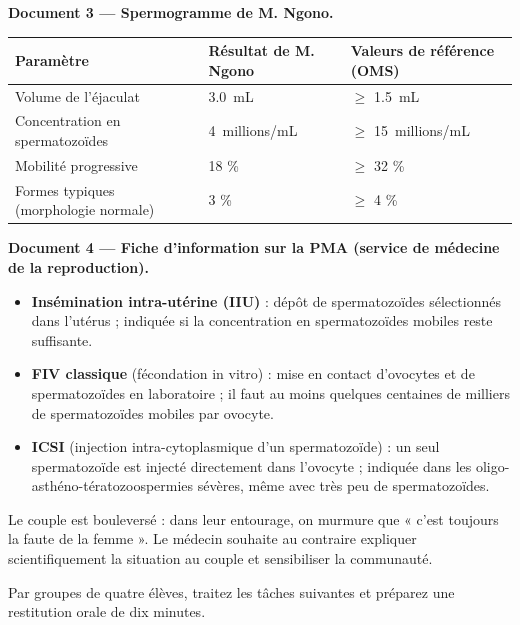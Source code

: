 \documentclass[11pt]{article}
\newcounter{popsec}
\newcounter{popsub}
\newcommand{\courssub}[1]{%
  \stepcounter{popsub}%
  \par\vspace{9pt}\noindent{\popxbold\fontsize{11.5}{13}\selectfont\color{popink}{\color{poporange}\thepopsec.\thepopsub}\hspace{6pt}#1}\par\nopagebreak\vspace{4pt}
}
\begin{document}
\textbf{Document 3 — Spermogramme de M. Ngono.}

\begin{center}
\begin{tabularx}{\linewidth}{|l|X|X|}
\hline
\rowcolor{popblueL} \textbf{Paramètre} & \textbf{Résultat de M. Ngono} & \textbf{Valeurs de référence (OMS)} \\
\hline
Volume de l'éjaculat & \SI{3,0}{mL} & $\geq$ \SI{1,5}{mL} \\
\hline
Concentration en spermatozoïdes & \SI{4}{millions/mL} & $\geq$ \SI{15}{millions/mL} \\
\hline
Mobilité progressive & 18 \% & $\geq$ 32 \% \\
\hline
Formes typiques (morphologie normale) & 3 \% & $\geq$ 4 \% \\
\hline
\end{tabularx}
\end{center}

\textbf{Document 4 — Fiche d'information sur la PMA (service de médecine de la reproduction).}

\begin{itemize}
\item \textbf{Insémination intra-utérine (IIU)} : dépôt de spermatozoïdes sélectionnés dans l'utérus ; indiquée si la concentration en spermatozoïdes mobiles reste suffisante.
\item \textbf{FIV classique} (fécondation in vitro) : mise en contact d'ovocytes et de spermatozoïdes en laboratoire ; il faut au moins quelques centaines de milliers de spermatozoïdes mobiles par ovocyte.
\item \textbf{ICSI} (injection intra-cytoplasmique d'un spermatozoïde) : un seul spermatozoïde est injecté directement dans l'ovocyte ; indiquée dans les oligo-asthéno-tératozoospermies sévères, même avec très peu de spermatozoïdes.
\end{itemize}

Le couple est bouleversé : dans leur entourage, on murmure que « c'est toujours la faute de la femme ». Le médecin souhaite au contraire expliquer scientifiquement la situation au couple et sensibiliser la communauté.

\courssub{Consignes}

Par groupes de quatre élèves, traitez les tâches suivantes et préparez une restitution orale de dix minutes.
\end{document}
